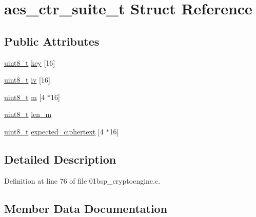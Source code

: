 \hypertarget{structaes__ctr__suite__t}{}\section{aes\+\_\+ctr\+\_\+suite\+\_\+t Struct Reference}
\label{structaes__ctr__suite__t}
\subsection*{Public Attributes}
\begin{DoxyCompactItemize}
\item 
\hyperlink{_p_e___types_8h_aba7bc1797add20fe3efdf37ced1182c5}{uint8\+\_\+t} \hyperlink{structaes__ctr__suite__t_ad36ce8b6fd4ae0375f7e72438cf9b577}{key} \mbox{[}16\mbox{]}
\item 
\hyperlink{_p_e___types_8h_aba7bc1797add20fe3efdf37ced1182c5}{uint8\+\_\+t} \hyperlink{structaes__ctr__suite__t_ae0a3edbc4df057fed4a6242dcfb71e04}{iv} \mbox{[}16\mbox{]}
\item 
\hyperlink{_p_e___types_8h_aba7bc1797add20fe3efdf37ced1182c5}{uint8\+\_\+t} \hyperlink{structaes__ctr__suite__t_a6195ae00084fb690584279fbd3e1a348}{m} \mbox{[}4 $\ast$16\mbox{]}
\item 
\hyperlink{_p_e___types_8h_aba7bc1797add20fe3efdf37ced1182c5}{uint8\+\_\+t} \hyperlink{structaes__ctr__suite__t_a04ece68639a0f54874b8fa08125d1a2b}{len\+\_\+m}
\item 
\hyperlink{_p_e___types_8h_aba7bc1797add20fe3efdf37ced1182c5}{uint8\+\_\+t} \hyperlink{structaes__ctr__suite__t_a23782904c47d1729b768332f48f2e3dc}{expected\+\_\+ciphertext} \mbox{[}4 $\ast$16\mbox{]}
\end{DoxyCompactItemize}


\subsection{Detailed Description}


Definition at line 76 of file 01bsp\+\_\+cryptoengine.\+c.



\subsection{Member Data Documentation}
